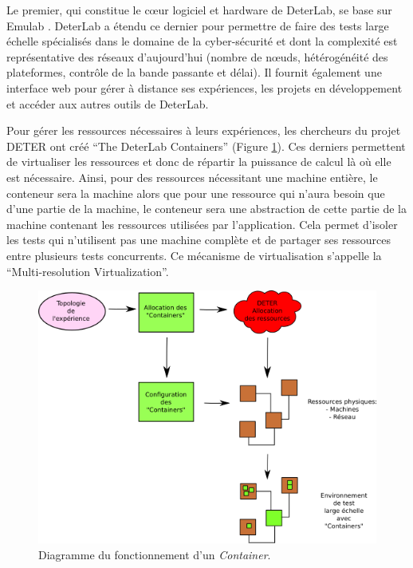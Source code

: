 Le premier, qui constitue le c\oe ur logiciel et hardware de DeterLab, se base
sur Emulab \citep{EMULAB_INIT}. DeterLab a étendu ce dernier pour permettre de
faire des tests large échelle spécialisés dans le domaine de la cyber-sécurité
et dont la complexité est représentative des réseaux d'aujourd'hui (nombre de
n\oe uds, hétérogénéité des plateformes, contrôle de la bande passante et
délai). Il fournit également une interface web pour gérer à distance ses
expériences, les projets en développement et accéder aux autres outils de
DeterLab.

Pour gérer les ressources nécessaires à leurs expériences, les
chercheurs du projet DETER ont créé ``The DeterLab Containers''
(Figure \ref{Conteneur}). Ces derniers permettent de virtualiser les
ressources et donc de répartir la puissance de calcul là où elle est
nécessaire. Ainsi, pour des ressources nécessitant une machine entière,
le conteneur sera la machine alors que pour une ressource qui n'aura
besoin que d'une partie de la machine, le conteneur sera une
abstraction de cette partie de la machine contenant les ressources
utilisées par l'application. Cela permet d'isoler les tests qui
n'utilisent pas une machine complète et de partager ses ressources
entre plusieurs tests concurrents. Ce mécanisme de virtualisation
s'appelle la ``Multi-resolution Virtualization''.

\begin{figure}
  \centering \includegraphics[scale=0.75]{Pictures/png/Deter_fonctionnement_container_v2}
  \caption{Diagramme du fonctionnement d'un \textit{Container}.}
  \label{Conteneur}
\end{figure}

